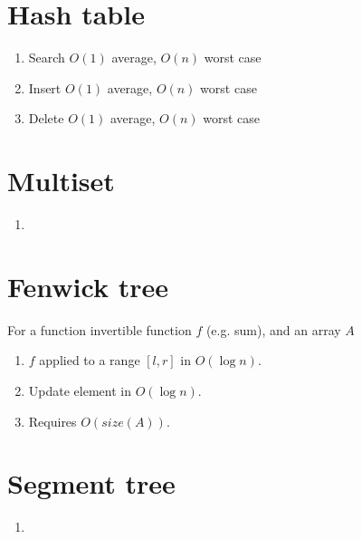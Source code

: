 \documentclass[titlepage, 12pt]{book}
\begin{document}
\section{Hash table}
\begin{enumerate}
    \item Search $O(1)$ average, $O(n)$ worst case
    \item Insert $O(1)$ average, $O(n)$ worst case
    \item Delete $O(1)$ average, $O(n)$ worst case
\end{enumerate}

\section{Multiset}
\begin{enumerate}
    \item 
\end{enumerate}

\section{Fenwick tree}
For a function invertible function $f$ (e.g. sum), and an array $A$
\begin{enumerate}
    \item $f$ applied to a range $[l, r]$ in $O(\log n)$.
    \item Update element in $O(\log n)$.
    \item Requires $O(size(A))$.
\end{enumerate}

\section{Segment tree}
\begin{enumerate}
    \item 
\end{enumerate}
\end{document}

